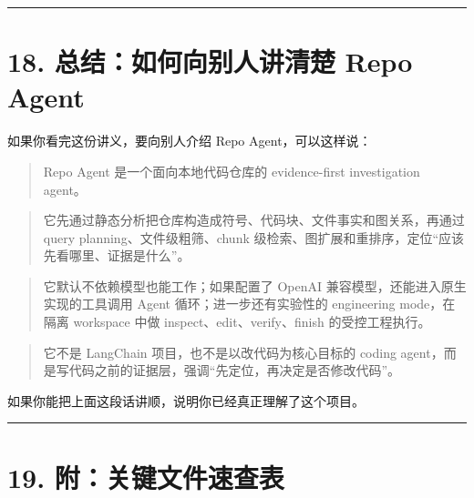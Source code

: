 \documentclass[UTF8,12pt,openany]{ctexbook}
\begin{document}
\hrule

\section{18. 总结：如何向别人讲清楚 Repo Agent}

如果你看完这份讲义，要向别人介绍 Repo Agent，可以这样说：\par

\begin{quote}
Repo Agent 是一个面向本地代码仓库的 evidence-first investigation agent。
\end{quote}
\begin{quote}
它先通过静态分析把仓库构造成符号、代码块、文件事实和图关系，再通过 query planning、文件级粗筛、chunk 级检索、图扩展和重排序，定位“应该先看哪里、证据是什么”。
\end{quote}
\begin{quote}
它默认不依赖模型也能工作；如果配置了 OpenAI 兼容模型，还能进入原生实现的工具调用 Agent 循环；进一步还有实验性的 engineering mode，在隔离 workspace 中做 inspect、edit、verify、finish 的受控工程执行。
\end{quote}
\begin{quote}
它不是 LangChain 项目，也不是以改代码为核心目标的 coding agent，而是写代码之前的证据层，强调“先定位，再决定是否修改代码”。
\end{quote}

如果你能把上面这段话讲顺，说明你已经真正理解了这个项目。\par

\hrule

\section{19. 附：关键文件速查表}
\end{document}
